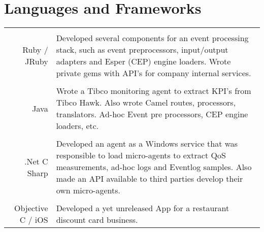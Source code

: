 \documentclass[a4paper,10pt]{article}
\begin{document}
\section{Languages and Frameworks}
\begin{tabular}{r|p{11cm}}
\multicolumn{2}{c}{} \\
	Ruby / JRuby
	& Developed several components for an event processing stack, such as event preprocessors, input/output adapters and Esper (CEP) engine loaders. 
	Wrote private gems with API's for company internal services.\\
\multicolumn{2}{c}{} \\
	Java
	&  Wrote a Tibco monitoring agent to extract KPI's from Tibco Hawk. Also wrote Camel routes, processors, translators. Ad-hoc Event pre processors, CEP engine loaders, etc.\\
\multicolumn{2}{c}{} \\
	.Net C Sharp
	&  Developed an agent as a Windows service that was responsible to load micro-agents to extract QoS measurements, ad-hoc logs and Eventlog samples. 
	Also made an API available to third parties develop their own micro-agents.\\
\multicolumn{2}{c}{} \\
	Objective C / iOS
	&  Developed a yet unreleased App for a restaurant discount card business.\\
\end{tabular}
\end{document}
